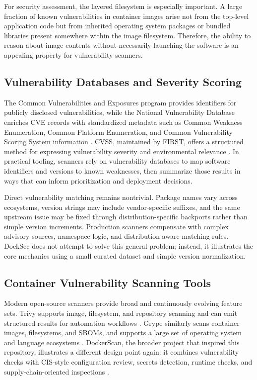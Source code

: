 \documentclass[12pt,draftclsnofoot,onecolumn]{IEEEtran}
\begin{document}
For security assessment, the layered filesystem is especially important. A large fraction of known vulnerabilities in container images arise not from the top-level application code but from inherited operating system packages or bundled libraries present somewhere within the image filesystem. Therefore, the ability to reason about image contents without necessarily launching the software is an appealing property for vulnerability scanners.

\subsection{Vulnerability Databases and Severity Scoring}
The Common Vulnerabilities and Exposures program provides identifiers for publicly disclosed vulnerabilities, while the National Vulnerability Database enriches CVE records with standardized metadata such as Common Weakness Enumeration, Common Platform Enumeration, and Common Vulnerability Scoring System information \cite{nvdgeneral}. CVSS, maintained by FIRST, offers a structured method for expressing vulnerability severity and environmental relevance \cite{cvss40}. In practical tooling, scanners rely on vulnerability databases to map software identifiers and versions to known weaknesses, then summarize those results in ways that can inform prioritization and deployment decisions.

Direct vulnerability matching remains nontrivial. Package names vary across ecosystems, version strings may include vendor-specific suffixes, and the same upstream issue may be fixed through distribution-specific backports rather than simple version increments. Production scanners compensate with complex advisory sources, namespace logic, and distribution-aware matching rules. DockSec does not attempt to solve this general problem; instead, it illustrates the core mechanics using a small curated dataset and simple version normalization.

\subsection{Container Vulnerability Scanning Tools}
Modern open-source scanners provide broad and continuously evolving feature sets. Trivy supports image, filesystem, and repository scanning and can emit structured results for automation workflows \cite{trivyhome,trivyimage}. Grype similarly scans container images, filesystems, and SBOMs, and supports a large set of operating system and language ecosystems \cite{grype}. DockerScan, the broader project that inspired this repository, illustrates a different design point again: it combines vulnerability checks with CIS-style configuration review, secrets detection, runtime checks, and supply-chain-oriented inspections \cite{dockerscanrepo}.
\end{document}
